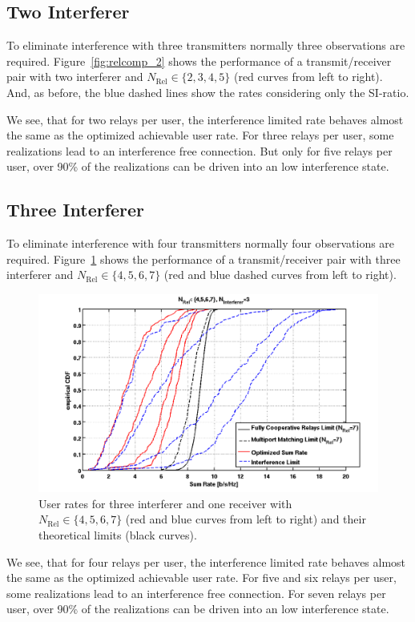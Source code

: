 \subsection{Two Interferer}
\label{sec:2interf}
To eliminate interference with three transmitters normally three observations are required.
Figure~\ref{fig:relcomp_2} shows the performance of a transmit/receiver pair with two interferer and $N_\text{Rel}\in\{2,3,4,5\}$ (red curves from left to right).
And, as before, the blue dashed lines show the rates considering only the SI-ratio.

We see, that for two relays per user, the interference limited rate behaves almost the same as the optimized achievable user rate.
For three relays per user, some realizations lead to an interference free connection.
But only for five relays per user, over 90\% of the realizations can be driven into an low interference state.

\subsection{Three Interferer}
\label{sec:3interf}
To eliminate interference with four transmitters normally four observations are required.
Figure~\ref{fig:relcomp_3} shows the performance of a transmit/receiver pair with three interferer and $N_\text{Rel}\in\{4,5,6,7\}$ (red and blue dashed curves from left to right).
\begin{figure}[h]
\centering
  \includegraphics[width=0.9\linewidth]{images/Relcomparison_3interferer.png}
\caption{User rates for three interferer and one receiver with $N_\text{Rel}\in\{4,5,6,7\}$ (red and blue curves from left to right) and their theoretical limits (black curves).}
\label{fig:relcomp_3}
\end{figure}

We see, that for four relays per user, the interference limited rate behaves almost the same as the optimized achievable user rate.
For five and six relays per user, some realizations lead to an interference free connection.
For seven relays per user, over 90\% of the realizations can be driven into an low interference state.

